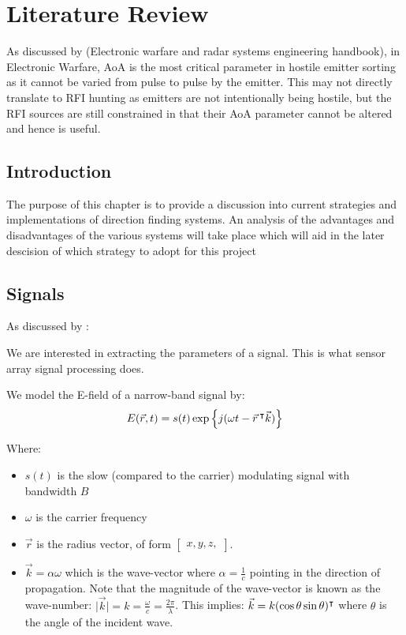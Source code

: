 \chapter{Literature Review}

As discussed by (Electronic warfare and radar systems engineering handbook), in Electronic Warfare, AoA is the most critical parameter in hostile emitter sorting as it cannot be varied from pulse to pulse by the emitter. This may not directly translate to RFI hunting as emitters are not intentionally being hostile, but the RFI sources are still constrained in that their AoA parameter cannot be altered and hence is useful. 


\section{Introduction}
The purpose of this chapter is to provide a discussion into current strategies and implementations of direction finding systems. An analysis of the advantages and disadvantages of the various systems will take place which will aid in the later descision of which strategy to adopt for this project

\section{Signals}
As discussed by \cite{krim1996two}:

We are interested in extracting the parameters of a signal. This is what sensor array signal processing does.

We model the E-field of a narrow-band signal by:
\begin{equation}
  E(\vec{r}, t) = s(t) \exp \left\{ j(\omega t - \vec{r}\, ^\intercal \vec{k}) \right\}
\end{equation}

Where:
\begin{itemize}
  \item \(s(t)\) is the slow (compared to the carrier) modulating signal with bandwidth \(B\)
  \item \(\omega\) is the carrier frequency
  \item \( \vec{r} \) is the radius vector, of form \( \begin{bmatrix} x, y, z, \end{bmatrix} \).
  \item \(\vec{k} = \alpha\omega\) which is the wave-vector where \(\alpha = \frac{1}{c}\) pointing in the direction of propagation. Note that the magnitude of the wave-vector is known as the wave-number: \(\lvert \vec{k} \rvert = k = \frac{\omega}{c} = \frac{2\pi}{\lambda}\). This implies: \(\vec{k} = k(\cos\theta \sin\theta)^\intercal\) where \(\theta\) is the angle of the incident wave.
\end{itemize}

